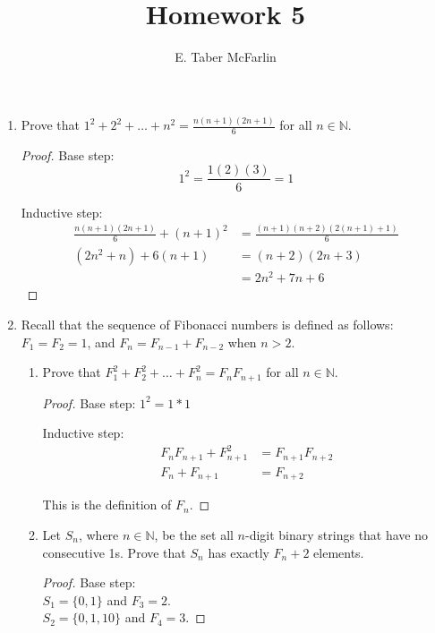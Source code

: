 \documentclass[12pt,a4paper,reqno,parskip=full]{amsart}
\numberwithin{equation}{section}
\theoremstyle{plain}
\theoremstyle{definition}
\begin{document}
\title{Homework 5}

\author{E. Taber McFarlin}

\maketitle

\begin{enumerate}
  \item Prove that $\displaystyle1^2+2^2+\ldots+n^2=\frac{n(n+1)(2n+1)}{6}$ for all $n\in\mathbb{N}$.
        \begin{proof} Base step:
          \[1^2 = \frac{1(2)(3)}{6} = 1\]

          Inductive step:
          \begin{align*}
            \frac{n(n + 1)(2n + 1)}{6} + (n + 1)^2 & = \frac{(n + 1)(n + 2)(2(n + 1) + 1)}{6} \\
            (2n^2 + n) + 6(n + 1)                  & = (n + 2)(2n + 3)                        \\
                                                   & = 2n^2 + 7n + 6
          \end{align*}
        \end{proof}

  \item Recall that the sequence of Fibonacci numbers is defined as follows: $F_1=F_2=1$, and $F_n=F_{n-1}+F_{n-2}$ when $n>2$.
        \begin{enumerate}
          \item Prove that $F_1^2+F_2^2+\ldots+F_n^2=F_nF_{n+1}$ for all $n\in\mathbb{N}$.
                \begin{proof} Base step: $1^2 = 1 * 1$

                  Inductive step:
                  \begin{align*}
                    F_nF_{n + 1} + F_{n + 1}^2 & = F_{n + 1}F_{n + 2} \\
                    F_n + F_{n + 1}            & = F_{n + 2}
                  \end{align*}

                  This is the definition of $F_n$.
                \end{proof}

          \item Let $S_n$, where $n\in\mathbb{N}$, be the set all $n$-digit binary strings that have no consecutive 1s. Prove that $S_n$ has exactly $F_n+2$ elements.
                \begin{proof} Base step: \\
                  $S_1 = \{0, 1\}$ and $F_3 = 2$. \\
                  $S_2 = \{0, 1, 10\}$ and $F_4 = 3$.


\end{proof}
\end{enumerate}
\end{enumerate}
\end{document}
